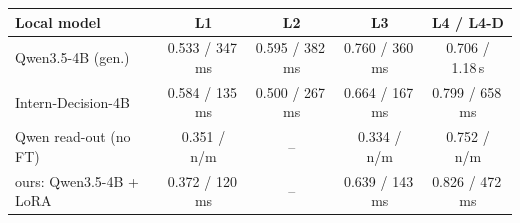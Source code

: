 \begin{tabular}{@{}lcccc@{}}
\toprule
Local model & L1 & L2 & L3 & L4 / L4-D \\
\midrule
Qwen3.5-4B (gen.) & 0.533 / {\scriptsize 347\,ms} & 0.595 / {\scriptsize 382\,ms} & 0.760 / {\scriptsize 360\,ms} & 0.706 / {\scriptsize 1.18\,s} \\
Intern-Decision-4B & 0.584 / {\scriptsize 135\,ms} & 0.500 / {\scriptsize 267\,ms} & 0.664 / {\scriptsize 167\,ms} & 0.799 / {\scriptsize 658\,ms} \\
Qwen read-out (no FT) & 0.351 / {\scriptsize n/m} & -- & 0.334 / {\scriptsize n/m} & 0.752 / {\scriptsize n/m} \\
ours: Qwen3.5-4B + LoRA & 0.372 / {\scriptsize 120\,ms} & -- & 0.639 / {\scriptsize 143\,ms} & 0.826 / {\scriptsize 472\,ms} \\
\bottomrule
\end{tabular}
